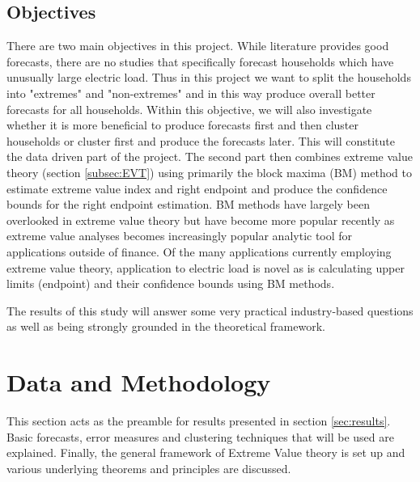 \documentclass[a4paper]{article}
\begin{document}



\subsection{Objectives}
\label{subsec:objectives}
There are two main objectives in this project. While literature provides good forecasts, there are no studies that specifically forecast households which have unusually large electric load. Thus in this project we want to split the households into "extremes" and "non-extremes" and in this way produce overall better forecasts for all households. Within this objective, we will also investigate whether it is more beneficial to produce forecasts first and then cluster households or cluster first and produce the forecasts later. This will constitute the data driven part of the project. The second part then combines extreme value theory (section \ref{subsec:EVT}) using primarily the block maxima (BM) method to estimate extreme value index and right endpoint and produce the confidence bounds for the right endpoint estimation. BM methods have largely been overlooked in extreme value theory but have become more popular recently as extreme value analyses becomes increasingly popular analytic tool for applications outside of finance. Of the many applications currently employing extreme value theory, application to electric load is novel as is calculating upper limits (endpoint) and their confidence bounds using BM methods.

The results of this study will answer some very practical industry-based questions as well as being strongly grounded in the theoretical framework.



\clearpage
\section{Data and Methodology}
\label{sec:D&M}
This section acts as the preamble for results presented in section \ref{sec:results}. Basic forecasts, error measures and clustering techniques that will be used are explained. Finally, the general framework of Extreme Value theory is set up and various underlying theorems and principles are discussed.
\end{document}
